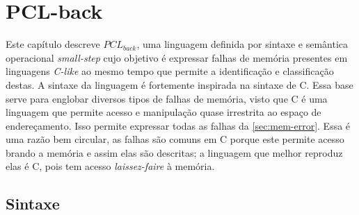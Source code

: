 \chapter{PCL-back}
\label{chap3}


Este capítulo descreve $PCL_{back}$, uma linguagem definida por sintaxe e semântica operacional \emph{small-step} cujo objetivo é expressar falhas de memória presentes em linguagens \emph{C-like} ao mesmo tempo que permite a identificação e classificação destas. A sintaxe da linguagem é fortemente inspirada na sintaxe de C. Essa base serve para englobar diversos tipos de falhas de memória, visto que C é uma linguagem que permite acesso e manipulação quase irrestrita ao espaço de endereçamento. Isso permite expressar todas as falhas da \autoref{sec:mem-error}. Essa é uma razão bem circular, as falhas são comuns em C porque este permite acesso brando a memória e assim elas são descritas; a linguagem que melhor reproduz elas é C, pois tem acesso \emph{laissez-faire} à memória.


\section{Sintaxe}
\label{sec:pclback:sintax}

